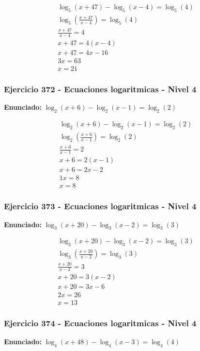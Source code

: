 \documentclass[12pt,a4paper]{article}
\begin{document}
\[
\begin{aligned}
\log_{5}\left(x+47\right) - \log_{5}\left(x-4\right)=\log_{5}\left(4\right)\\
\log_{5}\left(\frac{x+47}{x-4}\right)=\log_{5}\left(4\right)\\
\frac{x+47}{x-4}=4\\
x+47=4(x-4)\\
x+47=4x-16\\
3x=63\\
\boxed{x=21}
\end{aligned}
\]


\subsubsection*{Ejercicio 372 - Ecuaciones logaritmicas - Nivel 4}
\textbf{Enunciado:} \(\log_{2}\left(x+6\right) - \log_{2}\left(x-1\right)=\log_{2}\left(2\right)\)

\[
\begin{aligned}
\log_{2}\left(x+6\right) - \log_{2}\left(x-1\right)=\log_{2}\left(2\right)\\
\log_{2}\left(\frac{x+6}{x-1}\right)=\log_{2}\left(2\right)\\
\frac{x+6}{x-1}=2\\
x+6=2(x-1)\\
x+6=2x-2\\
1x=8\\
\boxed{x=8}
\end{aligned}
\]


\subsubsection*{Ejercicio 373 - Ecuaciones logaritmicas - Nivel 4}
\textbf{Enunciado:} \(\log_{3}\left(x+20\right) - \log_{3}\left(x-2\right)=\log_{3}\left(3\right)\)

\[
\begin{aligned}
\log_{3}\left(x+20\right) - \log_{3}\left(x-2\right)=\log_{3}\left(3\right)\\
\log_{3}\left(\frac{x+20}{x-2}\right)=\log_{3}\left(3\right)\\
\frac{x+20}{x-2}=3\\
x+20=3(x-2)\\
x+20=3x-6\\
2x=26\\
\boxed{x=13}
\end{aligned}
\]


\subsubsection*{Ejercicio 374 - Ecuaciones logaritmicas - Nivel 4}
\textbf{Enunciado:} \(\log_{4}\left(x+48\right) - \log_{4}\left(x-3\right)=\log_{4}\left(4\right)\)
\end{document}
